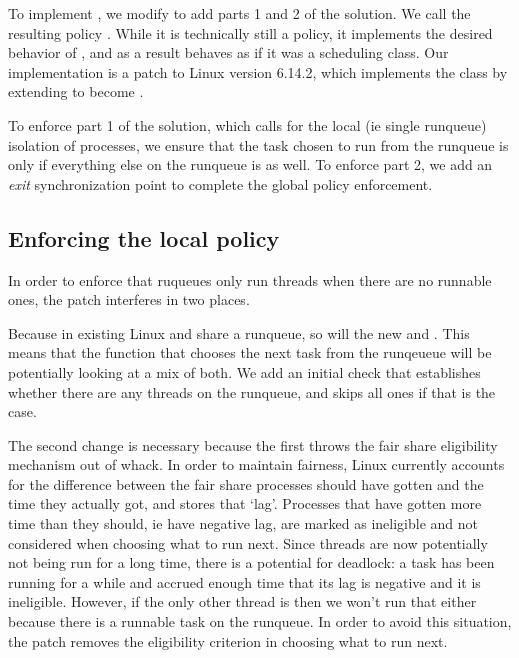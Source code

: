To implement \beclass{}, we modify \schedidle{} to add parts 1 and 2 of the
solution. We call the resulting policy \schedbe{}. While it is technically still
a policy, it implements the desired behavior of \beclass{}, and as a result
behaves as if it was a scheduling class. Our implementation is a patch to Linux
version 6.14.2, which implements the \beclass{} class by extending \schedidle{}
to become \schedbe{}.

To enforce part 1 of the solution, which calls for the local (ie single
runqueue) isolation of \schedbe{} processes, we ensure that the task chosen to
run from the runqueue is only \schedbe{} if everything else on the runqueue is
as well. To enforce part 2, we add an \textit{exit} synchronization point to
complete the global policy enforcement.

\subsection{Enforcing the local policy}

In order to enforce that ruqueues only run \schedbe{} threads when there are no
runnable \schednormal{} ones, the patch interferes in two places. 

Because in existing Linux \schedidle{} and \schednormal{} share a runqueue, so
will the new \schedbe{} and \schednormal{}. This means that the function that
chooses the next task from the runqeueue will be potentially looking at a mix of
both. We add an initial check that establishes whether there are any
\schednormal{} threads on the runqueue, and skips all \schedbe{} ones if that is
the case. 

The second change is necessary because the first throws the fair share
eligibility mechanism out of whack. In order to maintain fairness, Linux
currently accounts for the difference between the fair share processes should
have gotten and the time they actually got, and stores that `lag'. Processes
that have gotten more time than they should, ie have negative lag, are marked as
ineligible and not considered when choosing what to run next. Since \schedbe{}
threads are now potentially not being run for a long time, there is a potential
for deadlock: a \schednormal{} task has been running for a while and accrued
enough time that its lag is negative and it is ineligible. However, if the only
other thread is \schedbe{} then we won't run that either because there is a
runnable \schednormal{} task on the runqueue. In order to avoid this situation,
the patch removes the eligibility criterion in choosing what to run next.


